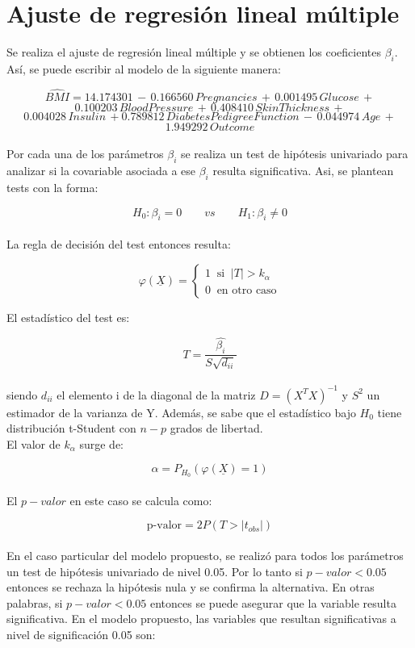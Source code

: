 \documentclass{article}
\begin{document}
\section{Ajuste de regresión lineal múltiple}
Se realiza el ajuste de regresión lineal múltiple y se obtienen los coeficientes \(\beta_i\). Así, se puede escribir al modelo de la siguiente manera:

$$\widehat{BMI} = 14.174301 \, - \, 0.166560 \, Pregnancies \, + \, 0.001495 \, Glucose \, +$$
$$0.100203 \, BloodPressure \, + \, 0.408410 \, SkinThickness \, +$$
$$0.004028 \, Insulin  \, + 0.789812 \, DiabetesPedigreeFunction \, - \, 0.044974 \, Age \, +$$
$$1.949292 \, Outcome$$\\

\noindent
Por cada una de los parámetros \(\beta_i\) se realiza un test de hipótesis univariado para analizar si la covariable asociada a ese \(\beta_i\) resulta significativa. Asi, se plantean tests con la forma:

$$H_0: \beta_i = 0\qquad vs\qquad H_1: \beta_i \neq 0$$\\

\noindent
La regla de decisión del test entonces resulta:

$$\varphi(\underline{X}) = \begin{cases}
                            1 \; \; \text{si} \; \;  |T| > k_{\alpha}\\
                            0 \; \; \text{en otro caso}
                        \end{cases}$$

\noindent
El estadístico del test es:

$$T = \frac{\hat{\beta_i}}{S \sqrt{d_{ii}}}$$\\

\noindent
siendo \(d_{ii}\) el elemento i de la diagonal de la matriz \(D = (X^T X)^{-1}\) y \(S^2\) un estimador de la varianza de Y. Además, se sabe que el estadístico bajo \(H_0\) tiene distribución t-Student con \(n - p\) grados de libertad.\\

\noindent
El valor de \(k_\alpha\) surge de:

$$\alpha = P_{H_0}(\varphi(\underline{X})=1)$$\\

\noindent
El \(p-valor\) en este caso se calcula como:

$$\text{p-valor} = 2 P(T > |t_{obs}|)$$\\

\noindent
En el caso particular del modelo propuesto, se realizó para todos los parámetros un test de hipótesis univariado de nivel 0.05. Por lo tanto si \(p-valor < 0.05\) entonces se rechaza la hipótesis nula y se confirma la alternativa. En otras palabras, si \(p-valor < 0.05\) entonces se puede asegurar que la variable resulta significativa. En el modelo propuesto, las variables que resultan significativas a nivel de significación 0.05 son:
\end{document}
